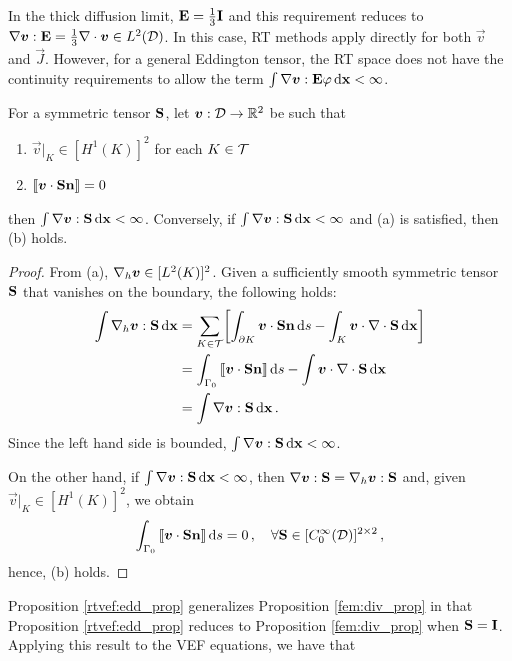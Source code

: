 \documentclass[../doc.tex]{subfiles}
\begin{document}
In the thick diffusion limit, $\E = \frac{1}{3}\I$ and this requirement reduces to $\nabla\vec{v}:\E = \frac{1}{3}\nabla\cdot\vec{v} \in L^2(\D)$. 
In this case, RT methods apply directly for both $\vec{v}$ and $\vec{J}$. However, for a general Eddington tensor, the RT space does not have the continuity requirements to allow the term $\int \nabla\vec{v} : \E\varphi \ud \x < \infty$. 
\begin{prop} \label{rtvef:edd_prop}
For a symmetric tensor $\mat{S}$, let $\vec{v} : \D\rightarrow \R^2$ be such that 
\begin{enumerate}
	\item $\vec{v}|_K \in [H^1(K)]^2$ for each $K \in \meshT$
	\item $\jump{\vec{v}\cdot\mat{S}\n} = 0$ 
\end{enumerate}
then $\int \nabla\vec{v} : \mat{S} \ud \x < \infty$. Conversely, if $\int \nabla\vec{v} : \mat{S} \ud \x < \infty$ and (a) is satisfied, then (b) holds. 
\end{prop}
\begin{proof}
From (a), $\nablah \vec{v} \in [L^2(K)]^2$. Given a sufficiently smooth symmetric tensor $\mat{S}$ that vanishes on the boundary, the following holds: 
	\begin{equation}
	\begin{aligned}
		\int \nablah\vec{v} : \mat{S} \ud \x &= \sum_{K\in\meshT} \bracket{\int_{\partial K} \vec{v}\cdot\mat{S}\n \ud s - \int_K \vec{v}\cdot\nabla\cdot\mat{S} \ud \x} \\
		&= \int_{\Gamma_0} \jump{\vec{v}\cdot\mat{S}\n} \ud s - \int \vec{v}\cdot\nabla\cdot\mat{S} \ud \x \\
		&= \int \nabla\vec{v} : \mat{S} \ud \x \,. 
	\end{aligned}
	\end{equation}
Since the left hand side is bounded, $\int \nabla\vec{v} : \mat{S} \ud \x < \infty$. 

On the other hand, if $\int \nabla\vec{v} : \mat{S} \ud \x < \infty$, then $\nabla\vec{v}:\mat{S} = \nablah\vec{v}:\mat{S}$ and, given $\vec{v}|_K\in[H^1(K)]^2$, we obtain 
	\begin{equation}
		\int_{\Gamma_0} \jump{\vec{v}\cdot\mat{S}\n} \ud s = 0 \,, \quad \forall \mat{S} \in [C_0^\infty(\D)]^{2\times 2} \,,
	\end{equation}
hence, (b) holds. 
\end{proof}
Proposition \ref{rtvef:edd_prop} generalizes Proposition \ref{fem:div_prop} in that Proposition \ref{rtvef:edd_prop} reduces to Proposition \ref{fem:div_prop} when $\mat{S} = \mat{I}$. Applying this result to the VEF equations, we have that 
\end{document}
